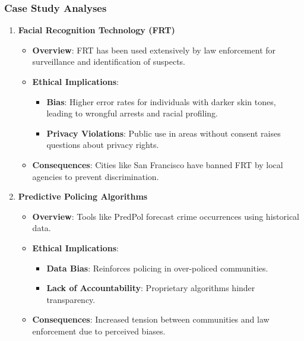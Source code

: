 \documentclass[aspectratio=169]{beamer}
\begin{document}
\begin{frame}[fragile]
    \frametitle{Case Study Analyses}
    \begin{enumerate}
        \item \textbf{Facial Recognition Technology (FRT)}
            \begin{itemize}
                \item \textbf{Overview}: FRT has been used extensively by law enforcement for surveillance and identification of suspects.
                \item \textbf{Ethical Implications}:
                    \begin{itemize}
                        \item \textbf{Bias}: Higher error rates for individuals with darker skin tones, leading to wrongful arrests and racial profiling.
                        \item \textbf{Privacy Violations}: Public use in areas without consent raises questions about privacy rights.
                    \end{itemize}
                \item \textbf{Consequences}: Cities like San Francisco have banned FRT by local agencies to prevent discrimination.
            \end{itemize}
        
        \item \textbf{Predictive Policing Algorithms}
            \begin{itemize}
                \item \textbf{Overview}: Tools like PredPol forecast crime occurrences using historical data.
                \item \textbf{Ethical Implications}:
                    \begin{itemize}
                        \item \textbf{Data Bias}: Reinforces policing in over-policed communities.
                        \item \textbf{Lack of Accountability}: Proprietary algorithms hinder transparency.
                    \end{itemize}
                \item \textbf{Consequences}: Increased tension between communities and law enforcement due to perceived biases.
            \end{itemize}
        

\end{enumerate}
\end{frame}
\end{document}

